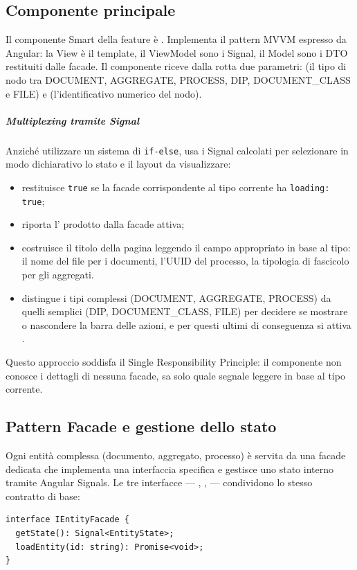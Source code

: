 \subsection{Componente principale}
Il componente Smart della feature è . Implementa il pattern MVVM espresso da Angular: la View è il template, il ViewModel sono i Signal, il Model sono i DTO restituiti dalle facade.
Il componente riceve dalla rotta due parametri:  (il tipo di nodo tra DOCUMENT, AGGREGATE, PROCESS, DIP, DOCUMENT\_CLASS e FILE) e  (l'identificativo numerico del nodo). 

\subparagraph{Multiplexing tramite Signal}
Anziché utilizzare un sistema di \texttt{if-else},  usa i Signal calcolati per selezionare in modo dichiarativo lo stato e il layout da visualizzare:
\begin{itemize}
    \item {} restituisce \texttt{true} se la facade corrispondente al tipo corrente ha \texttt{loading: true};
    \item {} riporta l' prodotto dalla facade attiva;
    \item {} costruisce il titolo della pagina leggendo il campo appropriato in base al tipo: il nome del file per i documenti, l'UUID del processo, la tipologia di fascicolo per gli aggregati.
    \item {} distingue i tipi complessi (DOCUMENT, AGGREGATE, PROCESS) da quelli semplici (DIP, DOCUMENT\_CLASS, FILE) per decidere se mostrare o nascondere la barra delle azioni, e per questi ultimi di conseguenza si attiva .
\end{itemize}
Questo approccio soddisfa il Single Responsibility Principle: il componente non conosce i dettagli di nessuna facade, sa solo quale segnale leggere in base al tipo corrente.

\subsection{Pattern Facade e gestione dello stato}
Ogni entità complessa (documento, aggregato, processo) è servita da una facade dedicata che implementa una interfaccia specifica e gestisce uno stato interno tramite Angular Signals. Le tre interfacce — , ,  — condividono lo stesso contratto di base:
\begin{verbatim}
interface IEntityFacade {
  getState(): Signal<EntityState>;
  loadEntity(id: string): Promise<void>;
}
\end{verbatim}

